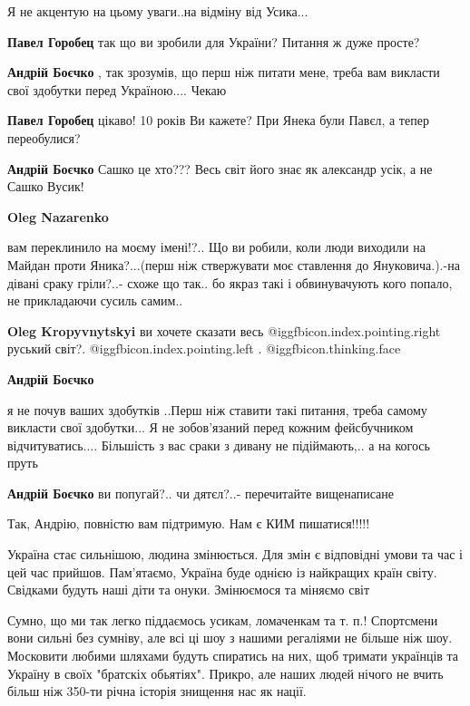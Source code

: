 \begin{itemize}
\begin{itemize}
Я не акцентую на цьому уваги..на відміну від Усика...


\textbf{Павел Горобец} так що ви зробили для України? Питання ж дуже просте?

\textbf{Андрій Боєчко} , так зрозумів, що перш ніж питати мене, треба вам викласти свої здобутки перед Україною....
Чекаю

\textbf{Павел Горобец} цікаво! 10 років Ви кажете? При Янека були Павєл, а тепер переобулися?

\textbf{Андрій Боєчко} Сашко це хто??? Весь світ його знає як александр усік, а не Сашко Вусик!

\textbf{Oleg Nazarenko} 

вам переклинило на моєму імені!?.. Що ви робили, коли люди виходили на Майдан
проти Яника?...(перш ніж ствержувати моє ставлення до Януковича.).-на дівані
сраку гріли?..- схоже що так.. бо якраз такі і обвинувачують кого попало, не
прикладаючи сусиль самим..

\textbf{Oleg Kropyvnytskyi} ви хочете сказати весь  @igg{fbicon.index.pointing.right} руський світ?. @igg{fbicon.index.pointing.left} . @igg{fbicon.thinking.face} 

\textbf{Андрій Боєчко} 

я не почув ваших здобутків ..Перш ніж ставити такі питання, треба самому
викласти свої здобутки...  Я не зобов'язаний перед кожним фейсбучником
відчитуватись.... Більшість з вас сраки з дивану не підіймають,.. а на когось
пруть

\textbf{Андрій Боєчко} ви попугай?.. чи дятєл?..- перечитайте вищенаписане
\end{itemize} %

Так, Андрію, повністю вам підтримую. Нам є КИМ пишатися!!!!!


Україна стає сильнішою, людина змінюється. Для змін є відповідні умови та час і
цей час прийшов. Пам'ятаємо, Україна буде однією із найкращих країн світу.
Свідками будуть наші діти та онуки. Змінюємося та міняємо світ



Сумно, що ми так легко піддаємось усикам, ломаченкам та т. п.! Спортсмени вони
сильні без сумніву, але всі ці шоу з нашими регаліями не більше ніж шоу.
Московити любими шляхами будуть спиратись на них, щоб тримати українців та
Україну в своїх "братскіх обьятіях". Прикро, але наших людей нічого не вчить
більш ніж 350-ти річна історія знищення нас як нації.


\end{itemize}
